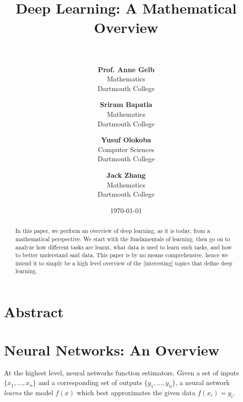 \documentclass[paper=a4, fontsize=12pt]{scrartcl} %
\title{	
    \normalfont \normalsize 
    \horrule{3pt} \\[0.4cm] %
    \LARGE \textbf{Deep Learning: A Mathematical Overview} \\[0.1cm] %
    \horrule{1pt} \\[0.5cm] %
}
\author{
    \footnotesize \textbf{Prof. Anne Gelb} \\[-0.3cm]
    \footnotesize Mathematics \\[-0.3cm]
    \footnotesize Dartmouth College
    \and
    \footnotesize \textbf{Sriram Bapatla} \\[-0.3cm]
    \footnotesize Mathematics \\[-0.3cm]
    \footnotesize Dartmouth College
    \and
    \footnotesize \textbf{Yusuf Olokoba} \\[-0.3cm]
    \footnotesize Computer Sciences \\[-0.3cm]
    \footnotesize Dartmouth College
    \and
    \footnotesize \textbf{Jack Zhang} \\[-0.3cm]
    \footnotesize Mathematics \\[-0.3cm]
    \footnotesize Dartmouth College
} %
\date{\normalsize\today} %
\numberwithin{equation}{section} %
\numberwithin{figure}{section} %
\numberwithin{table}{section} %
\begin{document}
\maketitle %


\section*{Abstract}

\begin{abstract}
    In this paper, we perform an overview of deep learning, as it is today, from a mathematical perspective.
    We start with the fundamentals of learning, then go on to analyze how different tasks are learnt, what data 
    is used to learn such tasks, and how to better understand said data.
    This paper is by no means comprehensive, hence we intend it to simply be a high level overview of the [interesting] 
    topics that define deep learning.
\end{abstract}

\pagebreak


\tableofcontents

\pagebreak


\section{Neural Networks: An Overview}

At the highest level, neural networks function estimators. Given a set of inputs $\{ x_1, \ldots, x_n \}$ and 
a corresponding set of outputs $\{ y_1, \ldots, y_n \}$, a neural network \textit{learns} the model $f(x)$ which 
best approximates the given data $f(x_i) = y_i$.
\end{document}
